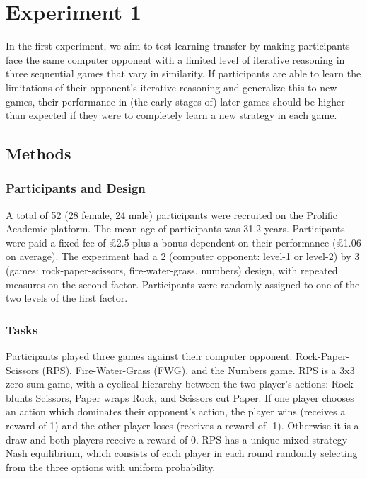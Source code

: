\documentclass[smallextended]{svjour3}       %
\begin{document}
\hypertarget{experiment-1}{%
\section{Experiment 1}\label{experiment-1}}

In the first experiment, we aim to test learning transfer by making
participants face the same computer opponent with a limited level of
iterative reasoning in three sequential games that vary in similarity.
If participants are able to learn the limitations of their opponent's
iterative reasoning and generalize this to new games, their performance
in (the early stages of) later games should be higher than expected if
they were to completely learn a new strategy in each game.

\hypertarget{methods}{%
\subsection{Methods}\label{methods}}

\hypertarget{participants-and-design}{%
\subsubsection{Participants and Design}\label{participants-and-design}}

A total of 52 (28 female, 24 male) participants were recruited on the
Prolific Academic platform. The mean age of participants was 31.2 years.
Participants were paid a fixed fee of £2.5 plus a bonus dependent on
their performance (£1.06 on average). The experiment had a 2 (computer
opponent: level-1 or level-2) by 3 (games: rock-paper-scissors,
fire-water-grass, numbers) design, with repeated measures on the second
factor. Participants were randomly assigned to one of the two levels of
the first factor.

\hypertarget{tasks}{%
\subsubsection{Tasks}\label{tasks}}

Participants played three games against their computer opponent:
Rock-Paper-Scissors (RPS), Fire-Water-Grass (FWG), and the Numbers game.
RPS is a 3x3 zero-sum game, with a cyclical hierarchy between the two
player's actions: Rock blunts Scissors, Paper wraps Rock, and Scissors
cut Paper. If one player chooses an action which dominates their
opponent's action, the player wins (receives a reward of 1) and the
other player loses (receives a reward of -1). Otherwise it is a draw and
both players receive a reward of 0. RPS has a unique mixed-strategy Nash
equilibrium, which consists of each player in each round randomly
selecting from the three options with uniform probability.
\end{document}
